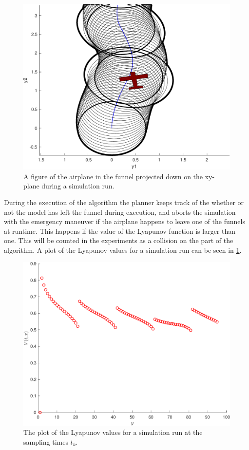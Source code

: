 \begin{figure}
  \centering \includegraphics[width=\textwidth]{figures/experiments/airplane-in-funnel} \caption{A figure of the
    airplane in the funnel projected down on the xy-plane during a simulation
    run.}
\end{figure}

During the execution of the \rrtfunnel{} algorithm the planner keeps track of
the whether or not the model has left the funnel during execution, and aborts
the simulation with the emergency maneuver if the airplane happens to leave one
of the funnels at runtime. This happens if the value of the Lyapunov function is
larger than one. This will be counted in the experiments as a collision on the
part of the \rrtfunnel{} algorithm. A plot of the Lyapunov values for a
simulation run can be seen in \cref{fig:lyapunov-values}.

\begin{figure}
  \centering
  \includegraphics[width=\textwidth]{figures/experiments/lyapunov-values-simulation-run}
  \caption{The plot of the Lyapunov values for a simulation run at the sampling
    times \(t_k\).}
  \label{fig:lyapunov-values}
\end{figure}

